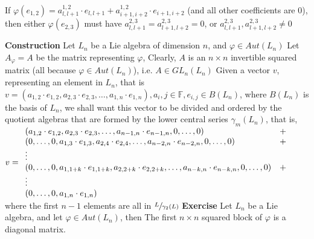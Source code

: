 \documentclass[12pt]{article}
\begin{document}
If $\varphi(e_{1,2})=a_{l,l+1}^{1,2} \cdot e_{l,l+1}+a_{i+1,i+2}^{1,2} \cdot e_{i+1,i+2}$ (and all other coefficients are $0$), \newline 
then either $\varphi(e_{2,3})$ must have $a_{l,l+1}^{2,3}=a_{l+1,l+2}^{2,3}=0$,
or $a_{l,l+1}^{2,3}, a_{l+1,l+2}^{2,3} \neq 0$
\newpage

\textbf{Construction} \newline
Let $L_n$ be a Lie algebra of dimension $n$, and $\varphi \in Aut(L_n)$ \newline 
Let $A_\varphi=A$ be the matrix representing $\varphi$, 
\newline
Clearly, $A$ is an $n \times n$ invertible squared matrix (all because $\varphi \in Aut(L_n)$), i.e. $A \in GL_n(L_n)$ \newline
Given a vector $v$, representing an element in $L_n$, that is \newline
$v=(a_{1,2} \cdot e_{1,2}, a_{2,3} \cdot e_{2,3},\dots,a_{1,n} \cdot e_{1,n}),a_i,j \in \mathbb{F},e_{i,j} \in B(L_n)$, where $B(L_n)$ is the basis of $L_n$, \newline
we shall want this vector to be divided and ordered by the quotient algebras that are formed by the lower central series $\gamma_m(L_n)$, that is, \newline
$v=\newline
	\begin{array}{ll}
(a_{1,2} \cdot e_{1,2}, a_{2,3} \cdot e_{2,3},\dots,a_{n-1,n} \cdot e_{n-1,n},0,\dots,0) & + \\
(0,\dots,0,a_{1,3} \cdot e_{1,3}, a_{2,4} \cdot e_{2,4},\dots,a_{n-2,n} \cdot e_{n-2,n},0,\dots,0) & + \\
\vdots \\
(0,\dots,0,a_{1,1+k} \cdot e_{1,1+k}, a_{2,2+k} \cdot e_{2,2+k},\dots,a_{n-k,n} \cdot e_{n-k,n},0,\dots,0) & + \\
\vdots \\
(0,\dots,0,a_{1,n} \cdot e_{1,n})
	\end{array}
$ \newline \newline
where the first $n-1$ elements are all in $\sfrac{L}{\gamma_2(L)}$
\newline \newline
\textbf{Exercise} \newline
Let $L_n$ be a Lie algebra, and let $\varphi \in Aut(L_n)$, then \newline
The first $n \times n$ squared block of $\varphi$ is a diagonal matrix. \newline \newline
\end{document}
